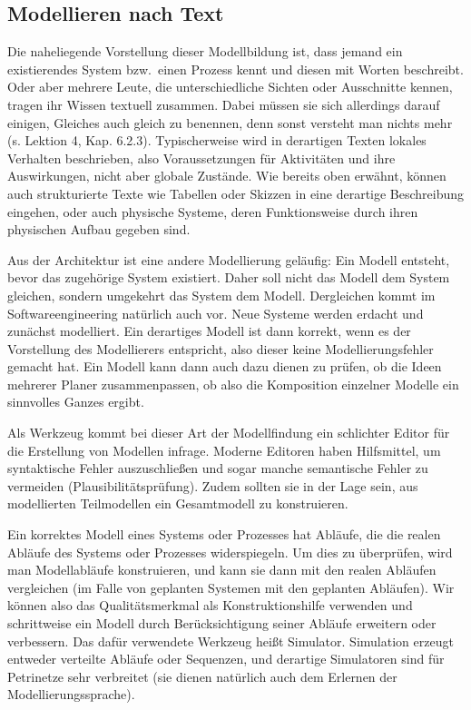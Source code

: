 \subsection*{Modellieren nach Text}
\label{text:modellieren_nach_text}

Die naheliegende Vorstellung dieser Modellbildung ist, 
dass jemand ein existierendes System bzw.\ einen Prozess kennt und diesen mit Worten beschreibt. Oder aber mehrere Leute, die unterschiedliche Sichten oder Ausschnitte kennen, tragen ihr Wissen textuell zusammen. Dabei müssen sie sich allerdings darauf einigen, Gleiches auch gleich zu benennen, denn sonst versteht man nichts mehr (s. Lektion 4, Kap. 6.2.3). Typischerweise wird in derartigen Texten lokales Verhalten beschrieben, also Voraussetzungen für Aktivitäten und ihre Auswirkungen, nicht aber globale Zustände. Wie bereits oben erwähnt, können auch strukturierte Texte wie Tabellen oder Skizzen in eine derartige Beschreibung eingehen, oder auch physische Systeme, deren Funktionsweise durch ihren physischen Aufbau gegeben sind.

Aus der Architektur ist eine andere Modellierung geläufig: 
Ein Modell entsteht, bevor das zugehörige System existiert. Daher soll nicht das Modell dem System gleichen, sondern umgekehrt das System dem Modell. Dergleichen kommt im Softwareengineering natürlich auch vor. Neue Systeme werden erdacht und zunächst modelliert. Ein derartiges Modell ist dann korrekt, wenn es der Vorstellung des Modellierers entspricht, also dieser keine Modellierungsfehler gemacht hat. Ein Modell kann dann auch dazu dienen zu prüfen, ob die Ideen mehrerer Planer zusammenpassen, ob also die Komposition einzelner Modelle ein sinnvolles Ganzes ergibt.

Als Werkzeug kommt bei dieser Art der Modellfindung ein schlichter Editor 
für die Erstellung von Modellen infrage. Moderne Editoren haben Hilfsmittel, um syntaktische Fehler auszuschließen und sogar manche semantische Fehler zu vermeiden (Plausibilitätsprüfung). Zudem sollten sie in der Lage sein, aus modellierten Teilmodellen ein Gesamtmodell zu konstruieren. 

Ein korrektes Modell eines Systems oder Prozesses hat Abläufe, die die realen Abläufe des Systems oder Prozesses widerspiegeln. Um dies zu überprüfen, wird man Modellabläufe konstruieren, und kann sie dann mit den realen Abläufen vergleichen (im Falle von geplanten Systemen mit den geplanten Abläufen). Wir können also das Qualitätsmerkmal als Konstruktionshilfe verwenden und schrittweise ein Modell durch Berücksichtigung seiner Abläufe erweitern oder verbessern. Das dafür verwendete Werkzeug 
heißt Simulator. Simulation erzeugt entweder verteilte Abläufe oder Sequenzen, und derartige Simulatoren sind für Petrinetze sehr verbreitet (sie dienen natürlich auch dem Erlernen der Modellierungssprache).

